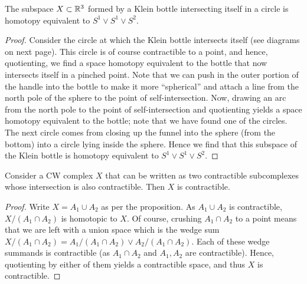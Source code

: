\documentclass{../../mathnotes}
\begin{document}
\begin{prop}
    The subspace $X\subset\mathbb{R}^3$ formed by a Klein bottle intersecting itself in a circle
    is homotopy equivalent to $S^1\vee S^1\vee S^2$.
\end{prop}
\begin{proof}
    Consider the circle at which the Klein bottle intersects itself (see diagrams on next page). This circle is of course
    contractible to a point, and hence, quotienting, we find a space homotopy equivalent to the bottle
    that now intersects itself in a pinched point. Note that we can push in the outer portion of the handle
    into the bottle to make it more ``spherical'' and attach a line from the north pole of the sphere to
    the point of self-intersection. Now, drawing an arc from the north pole to the point of self-intersection
    and quotienting yields a space homotopy equivalent to the bottle; note that we have found one of the circles.
    The next circle comes from closing up the funnel into the sphere (from the bottom) into a circle lying
    inside the sphere. Hence we find that this subspace of the Klein bottle is homotopy equivalent to $S^1\vee S^1\vee S^2$.
\end{proof}

\begin{prop}
    Consider a CW complex $X$ that can be written as two contractible subcomplexes whose intersection
    is also contractible. Then $X$ is contractible.
\end{prop}
\begin{proof}
    Write $X=A_1\cup A_2$ as per the proposition. As $A_1\cup A_2$ is contractible, $X/(A_1\cap A_2)$
    is homotopic to $X$. Of course, crushing $A_1\cap A_2$ to a point means that we are left with a union
    space which is the wedge sum $X/(A_1\cap A_2)=A_1/(A_1\cap A_2)\vee A_2/(A_1\cap A_2)$. 
    Each of these wedge summands is contractible (as $A_1\cap A_2$ and $A_1,A_2$ are contractible).
    Hence, quotienting by either of them yields a contractible space, and thus $X$ is contractible.
\end{proof}
\end{document}
